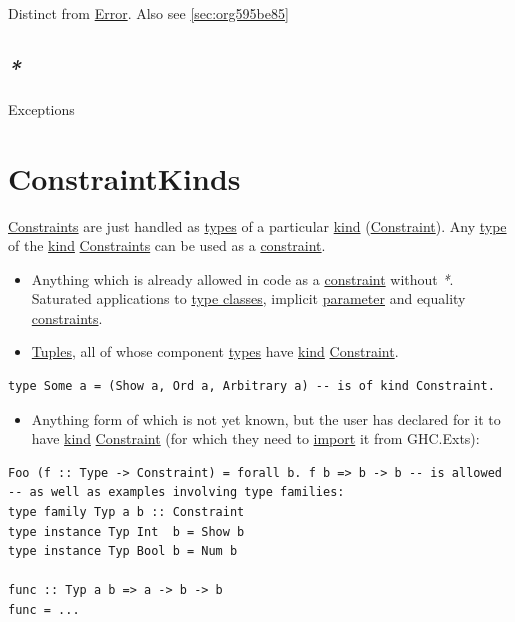 \documentclass[a4paper,14pt,oneside]{book}
\begin{document}
Distinct from \hyperref[org0ca6b45]{Error}. Also see \ref{sec:org595be85}

\section{\emph{*}}
\label{sec:orga29d2ea}

\label{org744a7a6}Exceptions

\chapter{\label{orgba11ec7}ConstraintKinds}
\label{sec:orgdf6e7a9}
\hyperref[org3ab01ca]{Constraints} are just handled as \hyperref[orgab10e29]{types} of a particular \hyperref[org9b1b28b]{kind} (\hyperref[org65b54dd]{Constraint}).
Any \hyperref[org01823ee]{type} of the \hyperref[org9b1b28b]{kind} \hyperref[org3ab01ca]{Constraints} can be used as a \hyperref[org65b54dd]{constraint}.
\begin{itemize}
\item Anything which is already allowed in code as a \hyperref[org65b54dd]{constraint} without \emph{*}. Saturated applications to \hyperref[org28eb2d6]{type classes}, implicit \hyperref[org4ac1801]{parameter} and equality \hyperref[org3ab01ca]{constraints}.
\item \hyperref[org00ec33c]{Tuples}, all of whose component \hyperref[orgab10e29]{types} have \hyperref[org9b1b28b]{kind} \hyperref[org65b54dd]{Constraint}.
\end{itemize}
\begin{verbatim}
type Some a = (Show a, Ord a, Arbitrary a) -- is of kind Constraint.
\end{verbatim}
\begin{itemize}
\item Anything form of which is not yet known, but the user has declared for it to have \hyperref[org9b1b28b]{kind} \hyperref[org65b54dd]{Constraint} (for which they need to \hyperref[org7c7fff9]{import} it from GHC.Exts):
\end{itemize}
\begin{verbatim}
Foo (f :: Type -> Constraint) = forall b. f b => b -> b -- is allowed
-- as well as examples involving type families:
type family Typ a b :: Constraint
type instance Typ Int  b = Show b
type instance Typ Bool b = Num b

func :: Typ a b => a -> b -> b
func = ...
\end{verbatim}
\end{document}
